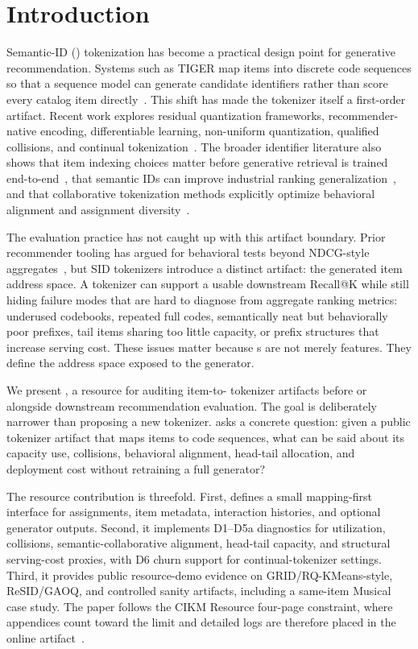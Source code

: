 \section{Introduction}

Semantic-ID (\sid) tokenization has become a practical design point for
generative recommendation. Systems such as TIGER map items into discrete code
sequences so that a sequence model can generate candidate identifiers rather
than score every catalog item directly~\cite{rajput2023tiger}. This shift has
made the tokenizer itself a first-order artifact. Recent work explores
residual quantization frameworks, recommender-native encoding, differentiable
\sid learning, non-uniform quantization, qualified collisions, and continual
tokenization~\cite{ju2025grid,liang2026resid,fu2026diger,wei2026card,hu2026quasid,feng2026dact}.
The broader identifier literature also shows that item indexing choices matter
before generative retrieval is trained end-to-end~\cite{hua2023indexids}, that
semantic IDs can improve industrial ranking generalization~\cite{singh2023bettersemanticids},
and that collaborative tokenization methods explicitly optimize behavioral
alignment and assignment diversity~\cite{zhu2024cost,wang2024letter}.

The evaluation practice has not caught up with this artifact boundary. Prior
recommender tooling has argued for behavioral tests beyond NDCG-style
aggregates~\cite{chia2022reclist}, but SID tokenizers introduce a distinct
artifact: the generated item address space. A
tokenizer can support a usable downstream Recall@K while still hiding failure
modes that are hard to diagnose from aggregate ranking metrics: underused
codebooks, repeated full codes, semantically neat but behaviorally poor
prefixes, tail items sharing too little capacity, or prefix structures that
increase serving cost. These issues matter because \sid{}s are not merely
features. They define the address space exposed to the generator.

We present \tool, a resource for auditing item-to-\sid{} tokenizer artifacts
before or alongside downstream recommendation evaluation. The goal is
deliberately narrower than proposing a new tokenizer. \tool asks a concrete
question: given a public tokenizer artifact that maps items to code sequences,
what can be said about its capacity use, collisions, behavioral alignment,
head-tail allocation, and deployment cost without retraining a full generator?

The resource contribution is threefold. First, \tool defines a small
mapping-first interface for \sid assignments, item metadata, interaction
histories, and optional generator outputs. Second, it implements D1--D5a
diagnostics for utilization, collisions, semantic-collaborative alignment,
head-tail capacity, and structural serving-cost proxies, with D6 churn support
for continual-tokenizer settings. Third, it provides public resource-demo
evidence on GRID/RQ-KMeans-style, ReSID/GAOQ, and controlled sanity artifacts,
including a same-item Musical case study. The paper follows the CIKM Resource
four-page constraint, where appendices count toward the limit and detailed
logs are therefore placed in the online artifact~\cite{cikm2026resource}.
